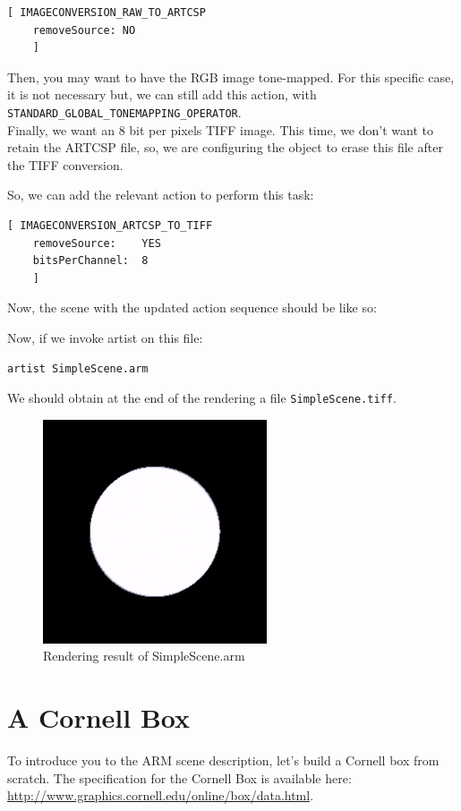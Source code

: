 \documentclass[a4paper,chapterprefix]{scrbook}
\begin{document}
\begin{lstlisting}
[ IMAGECONVERSION_RAW_TO_ARTCSP
    removeSource: NO
    ]
\end{lstlisting}

Then, you may want to have the RGB image tone-mapped. For this specific case, it is not necessary but, we can still add this action, with \verb?STANDARD_GLOBAL_TONEMAPPING_OPERATOR?. 
\\

Finally, we want an 8 bit per pixels TIFF image. This time, we don't want to retain the ARTCSP file, so, we are configuring the object to erase this file after the TIFF conversion.

So, we can add the relevant action to perform this task:
\begin{lstlisting}
[ IMAGECONVERSION_ARTCSP_TO_TIFF
    removeSource:    YES
    bitsPerChannel:  8
    ]
\end{lstlisting}

Now, the scene with the updated action sequence should be like so:



Now, if we invoke artist on this file:
\begin{verbatim}
artist SimpleScene.arm
\end{verbatim}

We should obtain at the end of the rendering a file \verb?SimpleScene.tiff?.

\begin{figure}[h]
	\centering
	\includegraphics[width=0.2\linewidth]{Example_Scene/SimpleScene.png}
	\caption{Rendering result of SimpleScene.arm}
\end{figure}


\chapter{A Cornell Box}
To introduce you to the ARM scene description, let's build a Cornell box from scratch. The specification for the Cornell Box is available here: \url{http://www.graphics.cornell.edu/online/box/data.html}.
\end{document}
